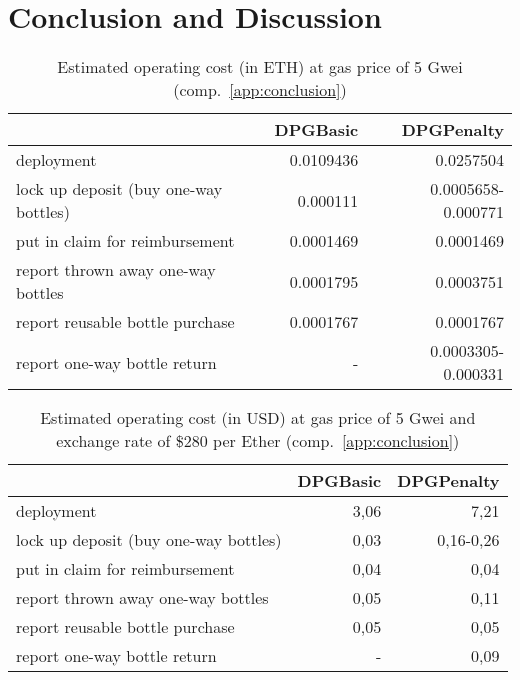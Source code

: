 
\chapter{Conclusion and Discussion}
\label{chp:conclusion}

\begin{table}[hbt]
	\centering	
	\begin{tabular}{l|r|r}
    	& DPGBasic & DPGPenalty \\
    	\hline
    	deployment & 0.0109436 & 0.0257504 \\
    	\hline
    	lock up deposit (buy one-way bottles) & 	0.000111 & 0.0005658-0.000771 \\ 
    	put in claim for reimbursement & 0.0001469 & 0.0001469 \\
    	report thrown away one-way bottles & 0.0001795 & 0.0003751 \\
    	report reusable bottle purchase & 0.0001767 & 0.0001767 \\
    	\hline
    	report one-way bottle return & - & 0.0003305-0.000331 \\
	\end{tabular}
	\caption[Estimated operating cost (in ETH)]{Estimated operating cost (in ETH) at gas price of 5 Gwei (comp.~\autoref{app:conclusion})}
	\label{tab:penaltyGas}
\end{table}

\begin{table}[hbt]
	\centering	
	\begin{tabular}{l|r|r}
    	& DPGBasic & DPGPenalty \\
    	\hline
    	deployment & 3,06 & 7,21 \\
    	\hline
    	lock up deposit (buy one-way bottles) & 	0,03 & 0,16-0,26 \\ 
    	put in claim for reimbursement & 0,04 & 0,04 \\
    	report thrown away one-way bottles & 0,05 & 0,11 \\
    	report reusable bottle purchase & 0,05 & 0,05 \\
    	\hline
    	report one-way bottle return & - & 0,09 \\
	\end{tabular}
	\caption[Estimated operating cost (in USD)]{Estimated operating cost (in USD) at gas price of 5 Gwei and exchange rate of \$280 per Ether (comp.~\autoref{app:conclusion})}
	\label{tab:penaltyGas}
\end{table}